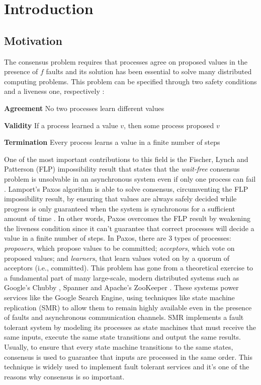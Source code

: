 
\chapter{Introduction}
\section{Motivation}
The consensus problem requires that processes agree on proposed values in the presence of $f$ faults and its solution has been essential to solve many distributed computing problems. This problem can be specified through two safety conditions and a liveness one, respectively \cite{vukolic2012quorum}: \par
\textbf{Agreement} No two processes learn different values\par 
\textbf{Validity} If a process learned a value $v$, then some process proposed $v$\par
\textbf{Termination} Every process learns a value in a finite number of steps\par
One of the most important contributions to this field is the Fischer, Lynch and Patterson (FLP) impossibility result that states that the \textit{wait-free} consensus problem is unsolvable in an asynchronous system even if only one process can fail \cite{Fischer1985}. Lamport's Paxos algorithm is able to solve consensus, circumventing the FLP impossibility result, by ensuring that values are always safely decided while progress is only guaranteed when the system is synchronous for a sufficient amount of time \cite{Lamport2001}. In other words, Paxos overcomes the FLP result by weakening the liveness condition since it can't guarantee that correct processes will decide a value in a finite number of steps. In Paxos, there are 3 types of processes: \textit{proposers}, which propose values to be committed; \textit{acceptors}, which vote on proposed values; and \textit{learners}, that learn values voted on by a quorum of acceptors (i.e., committed). This problem has gone from a theoretical exercise to a fundamental part of many large-scale, modern distributed systems such as Google's Chubby \cite{Burrows2006}, Spanner \cite{Corbett2012} and Apache's ZooKeeper \cite{Junqueira2011}. These systems power services like the Google Search Engine, using techniques like state machine replication (SMR) to allow them to remain highly available even in the presence of faults and asynchronous communication channels. SMR implements a fault tolerant system by modeling its processes as state machines that must receive the same inputs, execute the same state transitions and output the same results. Usually, to ensure that every state machine transitions to the same states, consensus is used to guarantee that inputs are processed in the same order. This technique is widely used to implement fault tolerant services and it's one of the reasons why consensus is so important.\par
